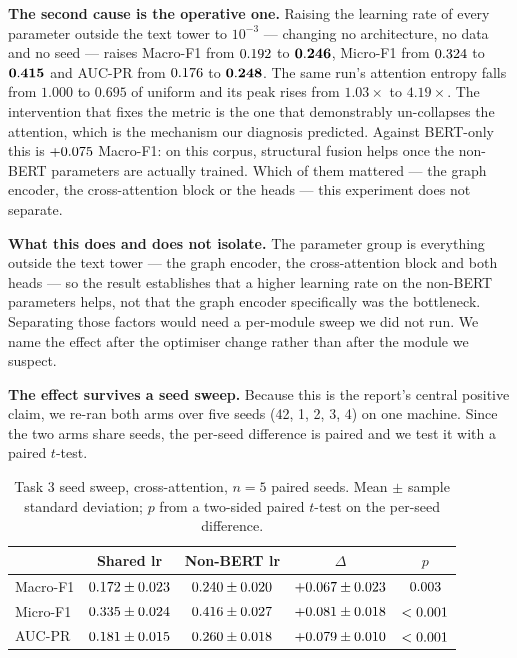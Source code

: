 \documentclass[conference]{IEEEtran}
\begin{document}
\textbf{The second cause is the operative one.} Raising the learning rate of
every parameter outside the text tower to $10^{-3}$ --- changing no
architecture, no data and no seed --- raises Macro-F1 from $0.192$ to
$\mathbf{0.246}$, Micro-F1 from $0.324$ to
$\mathbf{0.415}$ and AUC-PR from $0.176$ to
$\mathbf{0.248}$. The same run's attention entropy falls from
$1.000$ to $0.695$ of uniform and its peak rises from $1.03\times$ to
$4.19\times$. The intervention that fixes the metric is the one that
demonstrably un-collapses the attention, which is the mechanism our diagnosis
predicted. Against BERT-only this is $+0.075$ Macro-F1:
on this corpus, structural fusion helps once the non-BERT parameters are
actually trained. Which of them mattered --- the graph encoder, the
cross-attention block or the heads --- this experiment does not separate.

\noindent \textbf{What this does and does not isolate.} The parameter group is everything outside the text tower --- the graph encoder, the cross-attention block and both heads --- so the result establishes that a higher learning rate on the non-BERT parameters helps, not that the graph encoder specifically was the bottleneck. Separating those factors would need a per-module sweep we did not run. We name the effect after the optimiser change rather than after the module we suspect.

\textbf{The effect survives a seed sweep.} Because this is the report's central
positive claim, we re-ran both arms over five seeds (42, 1, 2, 3, 4) on one
machine. Since the two arms share seeds, the per-seed difference is paired and
we test it with a paired $t$-test.

\begin{table}[H]
\centering\small
\caption{Task 3 seed sweep, cross-attention, $n=5$ paired seeds. Mean $\pm$
sample standard deviation; $p$ from a two-sided paired $t$-test on the
per-seed difference.}
\label{tab:sweep}
\setlength{\tabcolsep}{1pt}
\begin{tabular}{lcccc}
\toprule
& Shared lr & Non-BERT lr & $\Delta$ & $p$ \\
\midrule
Macro-F1 & $0.172\pm0.023$ & $0.240\pm0.020$ & $+0.067\pm0.023$ & $0.003$ \\
Micro-F1 & $0.335\pm0.024$ & $0.416\pm0.027$ & $+0.081\pm0.018$ & $<0.001$ \\
AUC-PR   & $0.181\pm0.015$ & $0.260\pm0.018$ & $+0.079\pm0.010$ & $<0.001$ \\
\bottomrule
\end{tabular}
\end{table}
\end{document}
